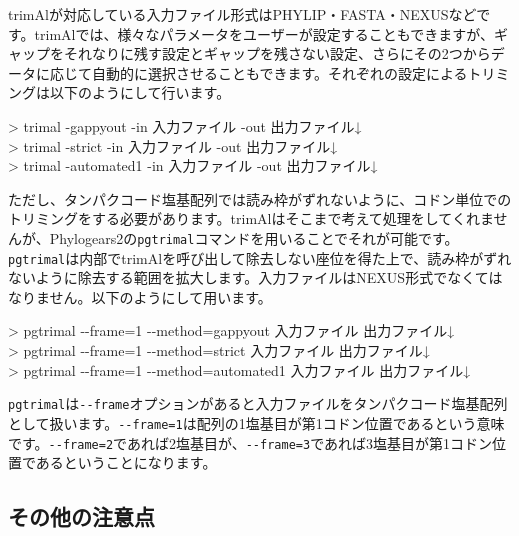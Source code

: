 \documentclass[titlepage,10pt,a4paper]{jsbook}
\newenvironment{cmd}{\begin{oframed}\raggedright\ttfamily\footnotesize\setlength{\baselineskip}{1.4em}}{\end{oframed}\vspace{-1em}}
\begin{document}
trimAlが対応している入力ファイル形式はPHYLIP・FASTA・NEXUSなどです。trimAlでは、様々なパラメータをユーザーが設定することもできますが、ギャップをそれなりに残す設定とギャップを残さない設定、さらにその2つからデータに応じて自動的に選択させることもできます。それぞれの設定によるトリミングは以下のようにして行います。
\begin{cmd}
{\textgreater} trimal -gappyout -in 入力ファイル -out 出力ファイル↓\\
{\textgreater} trimal -strict -in 入力ファイル -out 出力ファイル↓\\
{\textgreater} trimal -automated1 -in 入力ファイル -out 出力ファイル↓
\end{cmd}
ただし、タンパクコード塩基配列では読み枠がずれないように、コドン単位でのトリミングをする必要があります。trimAlはそこまで考えて処理をしてくれませんが、Phylogears2の\texttt{pgtrimal}コマンドを用いることでそれが可能です。\texttt{pgtrimal}は内部でtrimAlを呼び出して除去しない座位を得た上で、読み枠がずれないように除去する範囲を拡大します。入力ファイルはNEXUS形式でなくてはなりません。以下のようにして用います。
\begin{cmd}
{\textgreater} pgtrimal {-}{-}frame=1 {-}{-}method=gappyout 入力ファイル 出力ファイル↓\\
{\textgreater} pgtrimal {-}{-}frame=1 {-}{-}method=strict 入力ファイル 出力ファイル↓\\
{\textgreater} pgtrimal {-}{-}frame=1 {-}{-}method=automated1 入力ファイル 出力ファイル↓
\end{cmd}
\texttt{pgtrimal}は\texttt{{-}{-}frame}オプションがあると入力ファイルをタンパクコード塩基配列として扱います。\texttt{{-}{-}frame=1}は配列の1塩基目が第1コドン位置であるという意味です。\texttt{{-}{-}frame=2}であれば2塩基目が、\texttt{{-}{-}frame=3}であれば3塩基目が第1コドン位置であるということになります。

\subsection{その他の注意点}
\end{document}

